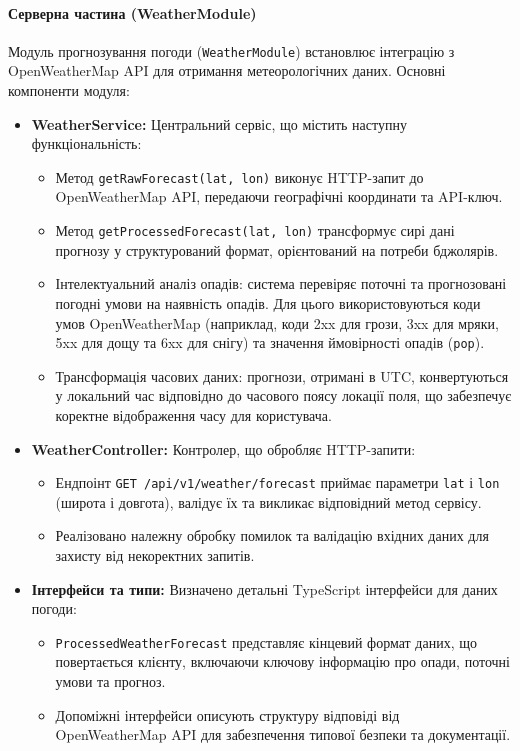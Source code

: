 \paragraph{Серверна частина (WeatherModule)}
Модуль прогнозування погоди (\texttt{WeatherModule}) встановлює інтеграцію з OpenWeatherMap API для отримання метеорологічних даних. Основні компоненти модуля:

\begin{itemize}
    \item \textbf{WeatherService:} Центральний сервіс, що містить наступну функціональність:
    \begin{itemize}
        \item Метод \texttt{getRawForecast(lat, lon)} виконує HTTP-запит до OpenWeatherMap API, передаючи географічні координати та API-ключ.
        \item Метод \texttt{getProcessedForecast(lat, lon)} трансформує сирі дані прогнозу у структурований формат, орієнтований на потреби бджолярів.
        \item Інтелектуальний аналіз опадів: система перевіряє поточні та прогнозовані погодні умови на наявність опадів. Для цього використовуються коди умов OpenWeatherMap (наприклад, коди 2xx для грози, 3xx для мряки, 5xx для дощу та 6xx для снігу) та значення ймовірності опадів (\texttt{pop}).
        \item Трансформація часових даних: прогнози, отримані в UTC, конвертуються у локальний час відповідно до часового поясу локації поля, що забезпечує коректне відображення часу для користувача.
    \end{itemize}
    
    \item \textbf{WeatherController:} Контролер, що обробляє HTTP-запити:
    \begin{itemize}
        \item Ендпоінт \texttt{GET /api/v1/weather/forecast} приймає параметри \texttt{lat} і \texttt{lon} (широта і довгота), валідує їх та викликає відповідний метод сервісу.
        \item Реалізовано належну обробку помилок та валідацію вхідних даних для захисту від некоректних запитів.
    \end{itemize}

    \item \textbf{Інтерфейси та типи:} Визначено детальні TypeScript інтерфейси для даних погоди:
    \begin{itemize}
        \item \texttt{ProcessedWeatherForecast} представляє кінцевий формат даних, що повертається клієнту, включаючи ключову інформацію про опади, поточні умови та прогноз.
        \item Допоміжні інтерфейси описують структуру відповіді від OpenWeatherMap API для забезпечення типової безпеки та документації.
    \end{itemize}
\end{itemize}


